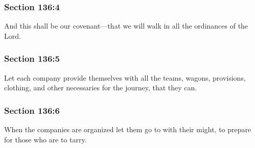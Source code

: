 	\subsubsection{Section 136:4} %
		\label{DC136-4}

		And this shall be our covenant—that we will walk in all the ordinances of the Lord.


	\subsubsection{Section 136:5} %
		\label{DC136-5}

		Let each company provide themselves with all the teams, wagons, provisions, clothing, and other necessaries for the journey, that they can.


	\subsubsection{Section 136:6} %
		\label{DC136-6}

		When the companies are organized let them go to with their might, to prepare for those who are to tarry.


